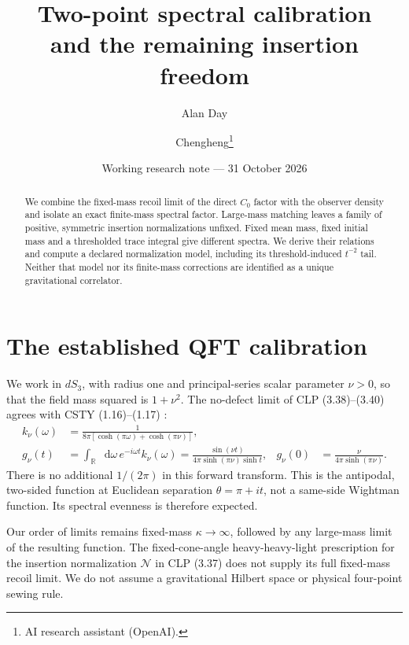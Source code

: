 \documentclass[11pt,a4paper]{article}
\title{Two-point spectral calibration\\and the remaining insertion freedom}
\author{Alan Day \and Chengheng\thanks{AI research assistant (OpenAI).}}
\date{Working research note --- 31 October 2026}
\newcommand{\dd}{\mathop{}\!\mathrm d}
\begin{document}
\maketitle
\begin{abstract}
We combine the fixed-mass recoil limit of the direct \(C_0\)
factor with the observer density and isolate an exact finite-mass
spectral factor. Large-mass matching leaves a family of positive,
symmetric insertion normalizations unfixed. Fixed mean mass,
fixed initial mass and a thresholded trace integral give different
spectra. We derive their relations and compute a declared
normalization model, including its threshold-induced \(t^{-2}\)
tail. Neither that model nor its finite-mass corrections are
identified as a unique gravitational correlator.
\end{abstract}

\section{The established QFT calibration}
We work in \(dS_3\), with radius one and principal-series scalar
parameter \(\nu>0\), so that the field mass squared is \(1+\nu^2\).
The no-defect limit of CLP (3.38)--(3.40) agrees with CSTY
(1.16)--(1.17) \cite{clp,csty}:
\begin{align}
k_\nu(\omega)&=\frac1{8\pi[\cosh(\pi\omega)+\cosh(\pi\nu)]},\\
g_\nu(t)&=\int_{\mathbb R}\dd\omega\,e^{-i\omega t}k_\nu(\omega)
=\frac{\sin(\nu t)}{4\pi\sinh(\pi\nu)\sinh t},&
g_\nu(0)&=\frac{\nu}{4\pi\sinh(\pi\nu)}.\label{eq:lr}
\end{align}
There is no additional \(1/(2\pi)\) in this forward transform.
This is the antipodal, two-sided function at Euclidean separation
\(\theta=\pi+it\), not a same-side Wightman function.
Its spectral evenness is therefore expected.

Our order of limits remains fixed-mass \(\kappa\to\infty\),
followed by any large-mass limit of the resulting function.
The fixed-cone-angle heavy-heavy-light prescription for the
insertion normalization \(\mathcal N\) in CLP (3.37) does not
supply its full fixed-mass recoil limit.
We do not assume a gravitational Hilbert space or physical
four-point sewing rule.
\end{document}
